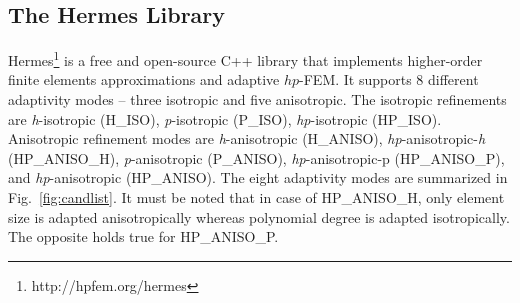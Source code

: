 \subsection{The Hermes Library}

Hermes\footnote{http://hpfem.org/hermes} is a free and open-source C++ library 
that implements higher-order finite elements approximations and adaptive $hp$-FEM.
It supports 8 different adaptivity modes -- three isotropic and five anisotropic. 
The isotropic refinements are
\emph{h}-isotropic (H\_ISO), \emph{p}-isotropic (P\_ISO), \emph{hp}-isotropic (HP\_ISO).
Anisotropic refinement modes are
\emph{h}-anisotropic (H\_ANISO),
\emph{hp}-anisotropic-\emph{h} (HP\_ANISO\_H), \emph{p}-anisotropic (P\_ANISO),
\emph{hp}-anisotropic-p (HP\_ANISO\_P), and \emph{hp}-anisotropic (HP\_ANISO).
The eight adaptivity modes are summarized in Fig.~\ref{fig:candlist}. It must
be noted that in case of HP\_ANISO\_H, only element size is adapted anisotropically
whereas polynomial degree is adapted isotropically. The opposite holds true
for HP\_ANISO\_P.

